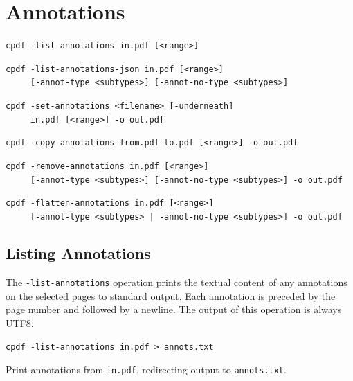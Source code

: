 \documentclass{book}
\begin{document}
\chapter{Annotations}\label{chap:10}
  \begin{framed}
  \small\noindent\verb!cpdf -list-annotations in.pdf [<range>]!

  \vspace{1.5mm}
  \small\noindent\verb!cpdf -list-annotations-json in.pdf [<range>]!\\
  \small\noindent\verb!     [-annot-type <subtypes>] [-annot-no-type <subtypes>]!

  \vspace{1.5mm}
  \small\noindent\verb!cpdf -set-annotations <filename> [-underneath]!\\
  \noindent\verb!     in.pdf [<range>] -o out.pdf!

  \vspace{1.5mm}
  \small\noindent\verb!cpdf -copy-annotations from.pdf to.pdf [<range>] -o out.pdf!

  \vspace{1.5mm}
  \small\noindent\verb!cpdf -remove-annotations in.pdf [<range>]!\\
  \small\noindent\verb!     [-annot-type <subtypes>] [-annot-no-type <subtypes>] -o out.pdf!

  \vspace{1.5mm}
  \small\noindent\verb!cpdf -flatten-annotations in.pdf [<range>]!\\
  \small\noindent\verb!     [-annot-type <subtypes> | -annot-no-type <subtypes>] -o out.pdf!
  \end{framed}

  \section{Listing Annotations}
  The \texttt{-list-annotations} operation prints the textual content of any
annotations on the selected pages to standard output. Each annotation is preceded by the page number and followed by a newline. The output of this operation is always UTF8.
  \begin{framed}
    \noindent\small\verb!cpdf -list-annotations in.pdf > annots.txt!
    
    \vspace{2.5mm}
    \noindent Print annotations from \texttt{in.pdf}, redirecting output to \texttt{annots.txt}.
  \end{framed}
\end{document}
